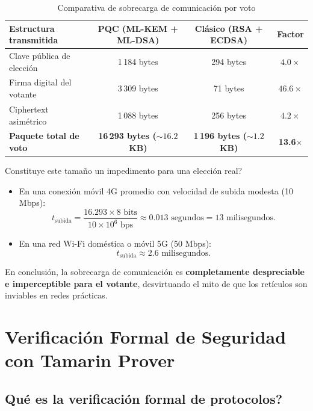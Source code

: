 \documentclass[11pt,a4paper,twoside,openright]{book}
\theoremstyle{plain}
\theoremstyle{definition}
\theoremstyle{remark}
\begin{document}
\begin{table}[H]
\centering
\caption{Comparativa de sobrecarga de comunicaci\'on por voto}
\label{tab:sobrecarga_red}
\begin{tabular}{lccc}
\toprule
\textbf{Estructura transmitida} & \textbf{PQC (ML-KEM + ML-DSA)} & \textbf{Cl\'asico (RSA + ECDSA)} & \textbf{Factor} \\
\midrule
Clave p\'ublica de elecci\'on & 1\,184 bytes & 294 bytes & $4.0\times$ \\
Firma digital del votante & 3\,309 bytes & 71 bytes & $46.6\times$ \\
Ciphertext asim\'etrico & 1\,088 bytes & 256 bytes & $4.2\times$ \\
\textbf{Paquete total de voto} & \textbf{16\,293 bytes ($\sim 16.2$ KB)} & \textbf{1\,196 bytes ($\sim 1.2$ KB)} & \textbf{13.6$\times$} \\
\bottomrule
\end{tabular}
\end{table}

\textquestiondown Constituye este tama\~no un impedimento para una elecci\'on real?
\begin{itemize}
  \item En una conexi\'on m\'ovil 4G promedio con velocidad de subida modesta (10 Mbps):
  \[
    t_{\text{subida}} = \frac{16.293 \times 8 \text{ bits}}{10 \times 10^6 \text{ bps}} \approx 0.013 \text{ segundos} = 13 \text{ milisegundos}.
  \]
  \item En una red Wi-Fi dom\'estica o m\'ovil 5G (50 Mbps):
  \[
    t_{\text{subida}} \approx 2.6 \text{ milisegundos}.
  \]
\end{itemize}
En conclusi\'on, la sobrecarga de comunicaci\'on es \textbf{completamente despreciable e imperceptible para el votante}, desvirtuando el mito de que los ret\'iculos son inviables en redes pr\'acticas.

\chapter{Verificaci\'on Formal de Seguridad con Tamarin Prover}
\label{chap:tamarin_formal}

\section{\textquestiondown Qu\'e es la verificaci\'on formal de protocolos?}
\end{document}
